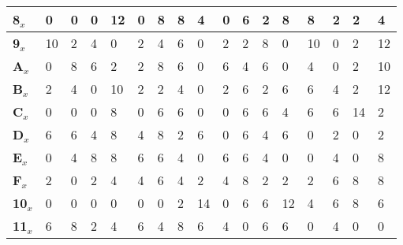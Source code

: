 \begin{longtable}[c]{|l|l|l|l|l|l|l|l|l|l|l|l|l|l|l|l|l|}
\textbf{8}$_x$  & 0          & 0          & 0          & 12         & 0          & 8          & 8          & 4          & 0          & 6          & 2          & 8          & 8          & 2          & 2          & 4          \\ \hline
\textbf{9}$_x$  & 10         & 2          & 4          & 0          & 2          & 4          & 6          & 0          & 2          & 2          & 8          & 0          & 10         & 0          & 2          & 12         \\ \hline
\textbf{A}$_x$ & 0          & 8          & 6          & 2          & 2          & 8          & 6          & 0          & 6          & 4          & 6          & 0          & 4          & 0          & 2          & 10         \\ \hline
\textbf{B}$_x$ & 2          & 4          & 0          & 10         & 2          & 2          & 4          & 0          & 2          & 6          & 2          & 6          & 6          & 4          & 2          & 12         \\ \hline
\textbf{C}$_x$ & 0          & 0          & 0          & 8          & 0          & 6          & 6          & 0          & 0          & 6          & 6          & 4          & 6          & 6          & 14         & 2          \\ \hline
\textbf{D}$_x$ & 6          & 6          & 4          & 8          & 4          & 8          & 2          & 6          & 0          & 6          & 4          & 6          & 0          & 2          & 0          & 2          \\ \hline
\textbf{E}$_x$ & 0          & 4          & 8          & 8          & 6          & 6          & 4          & 0          & 6          & 6          & 4          & 0          & 0          & 4          & 0          & 8          \\ \hline
\textbf{F}$_x$ & 2          & 0          & 2          & 4          & 4          & 6          & 4          & 2          & 4          & 8          & 2          & 2          & 2          & 6          & 8          & 8          \\ \hline
\textbf{10}$_x$ & 0          & 0          & 0          & 0          & 0          & 0          & 2          & 14         & 0          & 6          & 6          & 12         & 4          & 6          & 8          & 6          \\ \hline
\textbf{11}$_x$ & 6          & 8          & 2          & 4          & 6          & 4          & 8          & 6          & 4          & 0          & 6          & 6          & 0          & 4          & 0          & 0          \\ \hline

\end{longtable}
